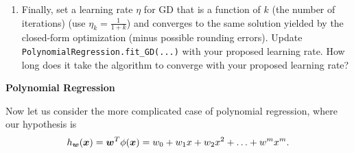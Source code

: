 \documentclass[11pt]{article}
\begin{document}
\begin{enumerate}[resume]
\item {} Finally, set a learning rate $\eta$ for GD that is a function of $k$ (the number of iterations) (use $\eta_k = \tfrac{1}{1+k}$) and converges to the same solution yielded by the closed-form optimization (minus possible rounding errors). Update \verb|PolynomialRegression.fit_GD(...)| with your proposed learning rate. How long does it take the algorithm to converge with your proposed learning rate?
\solution{

}

\end{enumerate}



\vspace{10pt} {\large \textbf{Polynomial Regression}}

Now let us consider the more complicated case of polynomial regression, where our hypothesis is
\begin{equation*}
h_{\boldsymbol{w}}(\boldsymbol{x}) = \boldsymbol{w}^T \phi(\boldsymbol{x}) = w_0 + w_1 x + w_2 x^2 + \ldots + w^m x^m.
\end{equation*}
\end{document}
